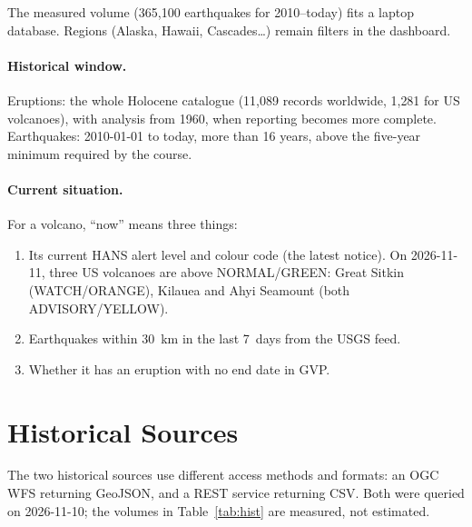 \documentclass[11pt,a4paper]{article}
\begin{document}
\noindent
The measured volume (365{,}100 earthquakes for 2010--today) fits a laptop database.
Regions (Alaska, Hawaii, Cascades\dots) remain filters in the dashboard.

\paragraph{Historical window.}
Eruptions: the whole Holocene catalogue (11{,}089 records worldwide, 1{,}281 for US
volcanoes), with analysis from 1960, when reporting becomes more complete.
Earthquakes: 2010-01-01 to today, more than 16 years, above the five-year minimum
required by the course.

\paragraph{Current situation.}
For a volcano, ``now'' means three things:
\begin{enumerate}
  \item Its current HANS alert level and colour code (the latest notice). On
  2026-11-11, three US volcanoes are above NORMAL/GREEN: Great Sitkin
  (WATCH/ORANGE), Kilauea and Ahyi Seamount (both ADVISORY/YELLOW).
  \item Earthquakes within 30~km in the last 7~days from the USGS feed.
  \item Whether it has an eruption with no end date in GVP.
\end{enumerate}

\section{Historical Sources}
\label{sec:historical}

The two historical sources use different access methods and formats: an OGC WFS
returning GeoJSON, and a REST service returning CSV. Both were queried on 2026-11-10;
the volumes in Table~\ref{tab:hist} are measured, not estimated.
\end{document}
